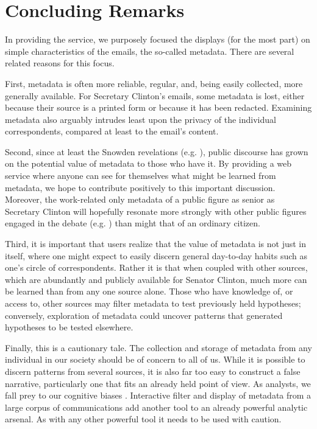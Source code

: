 \documentclass[journal]{vgtc}                %
\begin{document}
\section{Concluding Remarks}
In providing the service, we purposely focused the displays (for the most part) on simple characteristics of the emails, the so-called metadata.  There are several related reasons for this focus.  

First, metadata is often more reliable, regular, and, being easily collected, more generally available.  For Secretary Clinton's emails,  some metadata is lost, either because their source is a printed form or because it has been redacted.  Examining metadata also arguably intrudes least upon the privacy of the individual correspondents, compared at least to the email's content.  

Second, since at least the Snowden revelations (e.g. \cite{NYRsnowdenLeaks}), public discourse has grown on the potential value of metadata to those who have it.  By providing a web service where anyone can see for themselves what might be learned from metadata, we hope to contribute positively to this important discussion.  Moreover, the work-related only metadata of a public figure as senior as Secretary Clinton will hopefully resonate more strongly with other public figures  engaged in the debate (e.g.   \cite{NYRmetadata, ObamaMetadata, JebBushMetadata2015, PompeoMetadata, TrumpMetadata}) than might that of an ordinary citizen.  

Third, it is important that users realize that the value of metadata is not just in itself, where one might expect to easily discern general day-to-day habits such as one's circle of correspondents.  Rather it is that when coupled with other sources, which are abundantly and publicly available for Senator Clinton, much more can be learned than from any one source alone.  Those who have knowledge of, or access to, other sources may filter metadata to test previously held hypotheses; conversely, exploration of metadata could uncover patterns that generated hypotheses to be tested elsewhere. 

Finally, this is a cautionary tale.  The collection and storage of metadata from any individual in our society should be of concern to all of us.  While it is possible to discern patterns from several sources, it is also far too easy to construct a false narrative, particularly one that fits an already held point of view.  As analysts, we fall prey to our cognitive biases \cite{gilgovichBook}.  Interactive filter and display of metadata from a large corpus of communications add another tool to an already powerful analytic arsenal.  As with any other powerful tool it needs to be used with caution.  


\newpage


%
%
%
%


\end{document}
